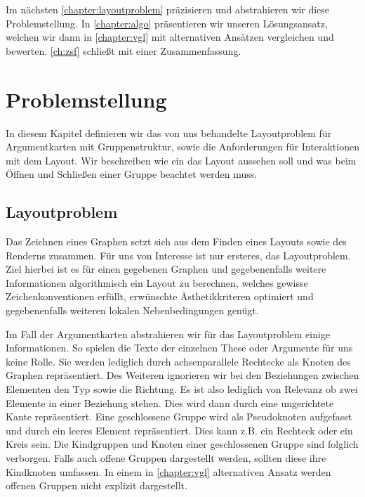 Im nächsten \autoref{chapter:layoutproblem}  präzisieren und abstrahieren wir diese Problemstellung. 
In \autoref{chapter:algo} präsentieren wir unseren Lösungsansatz, welchen wir dann in \autoref{chapter:vgl} mit alternativen Ansätzen vergleichen und bewerten.
\autoref{ch:zsf} schließt mit einer Zusammenfassung.

\chapter{Problemstellung}%
\label{chapter:layoutproblem}
In diesem Kapitel definieren wir das von uns behandelte Layoutproblem für Argumentkarten mit Gruppenstruktur, sowie die Anforderungen für Interaktionen mit dem Layout.
Wir beschreiben wie ein das Layout aussehen soll und was beim Öffnen und Schließen einer Gruppe beachtet werden muss.

\section{Layoutproblem}
\label{sec:layoutproblem}
Das Zeichnen eines Graphen setzt sich aus dem Finden eines Layouts sowie des Renderns zusammen. 
Für uns von Interesse ist nur ersteres, das Layoutproblem. 
Ziel hierbei ist es für einen gegebenen Graphen und gegebenenfalls weitere Informationen algorithmisch ein Layout zu berechnen,
welches gewisse Zeichenkonventionen erfüllt, erwünschte Ästhetikkriteren optimiert und gegebenenfalls weiteren lokalen Nebenbedingungen genügt.

Im Fall der Argumentkarten abstrahieren wir für das Layoutproblem einige Informationen. 
So spielen die Texte der einzelnen These oder Argumente für uns keine Rolle. 
Sie werden lediglich durch achsenparallele Rechtecke als Knoten des Graphen repräsentiert.
Des Weiteren ignorieren wir bei den Beziehungen zwischen Elementen den Typ sowie die Richtung. 
Es ist also lediglich von Relevanz ob zwei Elemente in einer Beziehung stehen.
Dies wird dann durch eine ungerichtete Kante repräsentiert. 
Eine geschlossene Gruppe wird als Pseudoknoten aufgefasst und durch ein leeres Element repräsentiert.
Dies kann  z.B. ein Rechteck oder ein Kreis sein.  Die Kindgruppen und Knoten einer geschlossenen Gruppe sind folglich verborgen.
Falls auch offene Gruppen dargestellt werden, sollten diese ihre Kindknoten umfassen. 
In einem in \autoref{chapter:vgl} alternativen Ansatz werden offenen Gruppen nicht explizit dargestellt.

